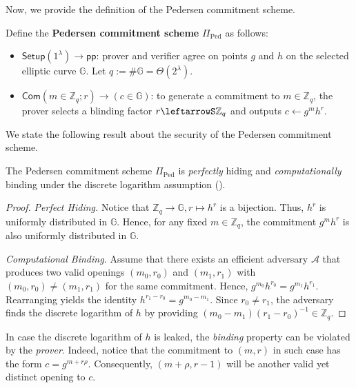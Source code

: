 \documentclass[../../book]{subfiles}
\begin{document}
Now, we provide the definition of the Pedersen commitment scheme.

\begin{definition}
    Define the \textbf{Pedersen commitment scheme} $\Pi_{\text{Ped}}$ as follows:
    \begin{itemize}
        \item $\mathsf{Setup}(1^{\lambda}) \to \mathsf{pp}$: prover and verifier agree on points $g$ and $h$ on the selected elliptic curve $\mathbb{G}$.
        Let $q:=\#\mathbb{G}=\Theta(2^{\lambda})$.
        \item $\mathsf{Com}(m \in \mathbb{Z}_q; r) \to (c \in \mathbb{G})$: to generate a commitment to $m \in \mathbb{Z}_q$, the prover selects a blinding factor $r \leftarrowS \mathbb{Z}_q$ and outputs $c \gets g^m h^r$.
    \end{itemize}
\end{definition}

We state the following result about the security of the Pedersen commitment scheme.

\begin{lemma}\label{lemma:pedersen-hiding-binding}
    The Pedersen commitment scheme $\Pi_{\text{Ped}}$ is \emph{perfectly} hiding and \emph{computationally} binding under the discrete logarithm assumption ().
\end{lemma}

\begin{proof}
    \emph{Perfect Hiding.} Notice that $\mathbb{Z}_q \to \mathbb{G}, r \mapsto h^r$ is a bijection. Thus, $h^r$ is uniformly distributed in $\mathbb{G}$.
    Hence, for any fixed $m \in \mathbb{Z}_q$, the commitment $g^mh^r$ is also uniformly distributed in $\mathbb{G}$.

    \emph{Computational Binding.} Assume that there exists an efficient adversary $\mathcal{A}$ that produces two valid openings $(m_0,r_0)$ and $(m_1,r_1)$ with $(m_0,r_0) \neq (m_1,r_1)$ for the same commitment. 
    Hence, $g^{m_0}h^{r_0} = g^{m_1}h^{r_1}$.
    Rearranging yields the identity $h^{r_1-r_0} = g^{m_0-m_1}$. 
    Since $r_0 \neq r_1$, the adversary finds the discrete logarithm of $h$ by providing $(m_0-m_1)(r_1-r_0)^{-1} \in \mathbb{Z}_q$.
\end{proof}

\begin{remark}
    In case the discrete logarithm of $h$ is leaked, the \emph{binding} property can be violated by the \emph{prover}.
    Indeed, notice that the commitment to $(m,r)$ in such case has the form $c = g^{m + r\rho}$.
    Consequently, $(m+\rho, r-1)$ will be another valid yet distinct opening to $c$.
\end{remark}
\end{document}
